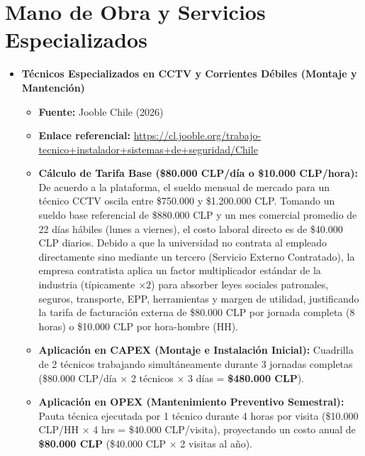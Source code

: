 \section{Mano de Obra y Servicios Especializados}
\begin{itemize}
    \item \textbf{Técnicos Especializados en CCTV y Corrientes Débiles (Montaje y Mantención)}
    \begin{itemize}
        \item \textbf{Fuente:} Jooble Chile (2026)
        \item \textbf{Enlace referencial:} \url{https://cl.jooble.org/trabajo-tecnico+instalador+sistemas+de+seguridad/Chile}
        \item \textbf{Cálculo de Tarifa Base (\$80.000 CLP/día o \$10.000 CLP/hora):} De acuerdo a la plataforma, el sueldo mensual de mercado para un técnico CCTV oscila entre \$750.000 y \$1.200.000 CLP. Tomando un sueldo base referencial de \$880.000 CLP y un mes comercial promedio de 22 días hábiles (lunes a viernes), el costo laboral directo es de \$40.000 CLP diarios. Debido a que la universidad no contrata al empleado directamente sino mediante un tercero (Servicio Externo Contratado), la empresa contratista aplica un factor multiplicador estándar de la industria (típicamente $\times 2$) para absorber leyes sociales patronales, seguros, transporte, EPP, herramientas y margen de utilidad, justificando la tarifa de facturación externa de \$80.000 CLP por jornada completa (8 horas) o \$10.000 CLP por hora-hombre (HH).
        \item \textbf{Aplicación en CAPEX (Montaje e Instalación Inicial):} Cuadrilla de 2 técnicos trabajando simultáneamente durante 3 jornadas completas (\$80.000 CLP/día $\times$ 2 técnicos $\times$ 3 días = \textbf{\$480.000 CLP}).
        \item \textbf{Aplicación en OPEX (Mantenimiento Preventivo Semestral):} Pauta técnica ejecutada por 1 técnico durante 4 horas por visita (\$10.000 CLP/HH $\times$ 4 hrs = \$40.000 CLP/visita), proyectando un costo anual de \textbf{\$80.000 CLP} (\$40.000 CLP $\times$ 2 visitas al año).
    \end{itemize}


\end{itemize}
